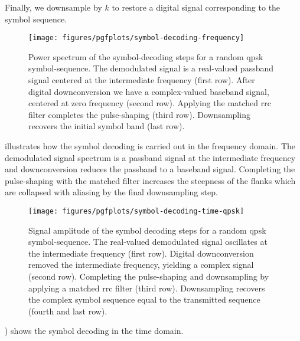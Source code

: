Finally, we downsample by $k$ to restore a digital signal corresponding to the symbol sequence.
\begin{figure}[htb]
	\centering
	\texttt{[image: figures/pgfplots/symbol-decoding-frequency]}
	\caption{Power spectrum of the symbol-decoding steps for a random \gls{qpsk} symbol-sequence. The demodulated signal is a real-valued passband signal centered at the intermediate frequency (first row). After digital downconversion we have a complex-valued baseband signal, centered at zero frequency (second row). Applying the matched \gls{rrc} filter completes the pulse-shaping (third row). Downsampling recovers the initial symbol band (last row).}\label{fig:symbol_decoding_frequency}
\end{figure}
 illustrates how the symbol decoding is carried out in the frequency domain.
The demodulated signal spectrum is a passband signal at the intermediate frequency and downconversion reduces the passband to a baseband signal.
Completing the pulse-shaping with the matched filter increases the steepness of the flanks which are collapsed with aliasing by the final downsampling step.
\begin{figure}[htb]
	\centering
	\texttt{[image: figures/pgfplots/symbol-decoding-time-qpsk]}
	\caption{Signal amplitude of the symbol decoding steps for a random \gls{qpsk} symbol-sequence. The real-valued demodulated signal oscillates at the intermediate frequency (first row). Digital downconversion removed the intermediate frequency, yielding a complex signal (second row). Completing the pulse-shaping and downsampling by applying a matched \gls{rrc} filter (third row). Downsampling recovers the complex symbol sequence equal to the transmitted sequence (fourth and last row).}\label{fig:symbol_decoding_time}
\end{figure}
) shows the symbol decoding in the time domain.
